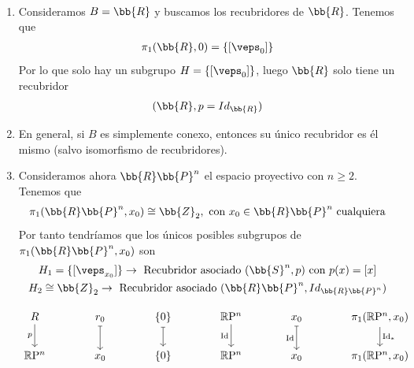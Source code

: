 \begin{ejemplo}\
    \begin{enumerate}
        \item Consideramos $B=\bb{R}$ y buscamos los recubridores de $\bb{R}$. Tenemos que 
        \begin{gather*}
            \pi_1(\bb{R},0) = \{[\veps_0]\}
        \end{gather*}
        Por lo que solo hay un subgrupo $H=\{[\veps_0]\}$, luego $\bb{R}$ solo tiene un recubridor
        \begin{gather*}
            (\bb{R}, p= Id_{\bb{R}})
        \end{gather*}

        \item En general, si $B$ es simplemente conexo, entonces su único recubridor es él mismo (salvo isomorfismo de recubridores).
        
        \item Consideramos ahora $\bb{R}\bb{P}^n$ el espacio proyectivo con $n\geq 2$. Tenemos que
        \begin{gather*}
            \pi_1(\bb{R}\bb{P}^n, x_0) \cong \bb{Z}_2, \text{ con } x_0\in \bb{R}\bb{P}^n \text{ cualquiera}
        \end{gather*}
        Por tanto tendríamos que los únicos posibles subgrupos de $\pi_1(\bb{R}\bb{P}^n, x_0)$ son
        \begin{gather*}
            H_1 = \{[\veps_{x_0}]\} \to \text{ Recubridor asociado } (\bb{S}^n, p) \text{ con } p(x)=[x]\\
            H_2 \cong \bb{Z}_2 \to \text{ Recubridor asociado } (\bb{R}\bb{P}^n, Id_{\bb{R}\bb{P}^n})
        \end{gather*}



    \[
    \begin{tikzcd}[column sep=large]
        R \arrow[d, "p"'] & r_0 \arrow[d, maps to] & \{0\} \arrow[d, maps to] & \mathbb{R}\mathrm{P}^n \arrow[d, "\mathrm{Id}"'] & x_0 \arrow[d, maps to, "\mathrm{Id}"'] & \pi_1(\mathbb{R}\mathrm{P}^n, x_0) \arrow[d, "\mathrm{Id}_*"] \\
        \mathbb{R}\mathrm{P}^n & x_0 & \{0\} & \mathbb{R}\mathrm{P}^n & x_0 & \pi_1(\mathbb{R}\mathrm{P}^n, x_0)
    \end{tikzcd}
    \]


\end{enumerate}
\end{ejemplo}
